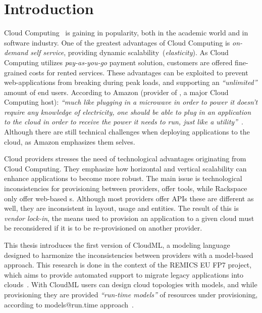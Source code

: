 \chapter{Introduction}

Cloud Computing~\cite{Armbrust:EECS-2009-28} is gaining in popularity,
both in the academic world and in software industry.
One of the greatest advantages of Cloud Computing is \emph{on-demand self service},
providing dynamic scalability~(\emph{elasticity}).
As Cloud Computing utilizes \emph{pay-as-you-go} payment solution,
customers are offered fine-grained costs for rented services.
These advantages can be exploited to prevent web-applications
from breaking during peak loads, and supporting an \emph{``unlimited''}
amount of end users.
According to Amazon (provider of , a major Cloud Computing host):
\emph{``much like plugging in a microwave in order to power it doesn't require any knowledge of electricity,
one should be able to plug in an application to the cloud in order
to receive the power it needs to run, 
just like a utility''}~\cite{aws:varia10}.
Although there are still technical challenges when deploying applications to the cloud,
as Amazon emphasizes them selves.

Cloud providers stresses the need of technological advantages originating from Cloud Computing.
They emphasize how horizontal and vertical scalability can enhance applications
to become more robust.
The main issue is technological inconsistencies for provisioning between providers,
\eg {} offer  tools, while Rackspace only offer web-based s.
Although most providers offer APIs these are different as well, 
they are inconsistent in layout, usage and entities.
The result of this is \emph{vendor lock-in}, the means used to provision an application to
a given cloud must be reconsidered if it is to be re-provisioned on another provider.

This thesis introduces the first version of CloudML,
a modeling language designed to harmonize the inconsistencies between providers
with a model-based approach.
This research is done in the context of the REMICS EU FP7 project,
which aims to provide automated support to migrate legacy applications into
clouds~\cite{DBLP:conf/services/MohagheghiS11}.
With CloudML users can design cloud topologies with models,
and while provisioning they are provided \emph{``run-time models''} of 
resources under provisioning,
according to models@run.time approach~\cite{DBLP:journals/dagstuhl-reports/AssmannBCF11}.

